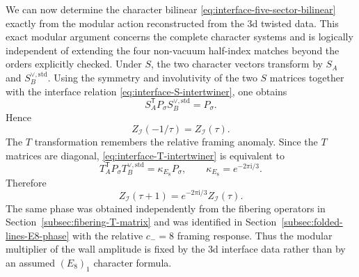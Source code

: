 \documentclass[11pt,a4paper]{article}
\numberwithin{equation}{section}
\begin{document}
We can now determine the character bilinear \eqref{eq:interface-five-sector-bilinear} exactly from the modular action reconstructed from the 3d twisted data.  This exact modular argument concerns the complete character systems and is logically independent of extending the four non-vacuum half-index matches beyond the orders explicitly checked.  Under $S$, the two character vectors transform by $S_A$ and $S_B^{\vee,\mathrm{std}}$.  Using the symmetry and involutivity of the two $S$ matrices together with the interface relation \eqref{eq:interface-S-intertwiner}, one obtains
\begin{equation}
  S_A^{\mathsf T}P_\sigma S_B^{\vee,\mathrm{std}}
  =P_\sigma.
  \label{eq:interface-bilinear-S-invariance}
\end{equation}
Hence
\begin{equation}
  Z_{\mathcal I}(-1/\tau)
  =Z_{\mathcal I}(\tau).
  \label{eq:interface-Z-S-transformation}
\end{equation}
The $T$ transformation remembers the relative framing anomaly.  Since the $T$ matrices are diagonal, \eqref{eq:interface-T-intertwiner} is equivalent to
\begin{equation}
  T_A^{\mathsf T}P_\sigma T_B^{\vee,\mathrm{std}}
  =\kappa_{E_8}P_\sigma,
  \qquad
  \kappa_{E_8}=e^{-2\pi \mathrm{i}/3}.
  \label{eq:interface-bilinear-T-multiplier}
\end{equation}
Therefore
\begin{equation}
  Z_{\mathcal I}(\tau+1)
  =e^{-2\pi \mathrm{i}/3}Z_{\mathcal I}(\tau).
  \label{eq:interface-Z-T-transformation}
\end{equation}
The same phase was obtained independently from the fibering operators in Section~\ref{subsec:fibering-T-matrix} and was identified in Section~\ref{subsec:folded-lines-E8-phase} with the relative $c_-=8$ framing response.  Thus the modular multiplier of the wall amplitude is fixed by the 3d interface data rather than by an assumed $(E_8)_1$ character formula.
\end{document}
